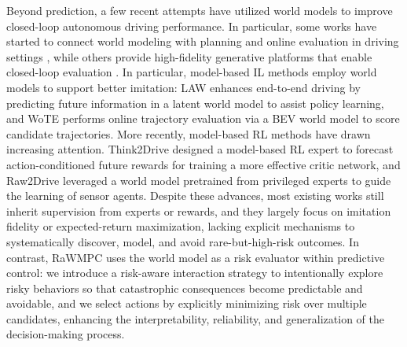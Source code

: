 \documentclass[twocolumn]{template}
\theoremstyle{thmstyleone}%
\theoremstyle{thmstyletwo}%
\theoremstyle{thmstylethree}%
\begin{document}
Beyond prediction, a few recent attempts have utilized world models to improve closed-loop autonomous driving performance. In particular, some works have started to connect world modeling with planning and online evaluation in driving settings \cite{DrivingGPT,Epona,WoTE},
while others provide high-fidelity generative platforms that enable closed-loop evaluation \cite{Navsim,DriveArena,Navsim_v2}. 
In particular, model-based IL methods \cite{MILE,LAW,WoTE,Drivedpo} employ world models to support better imitation: LAW \cite{LAW} enhances end-to-end driving by predicting future information in a latent world model to assist policy learning, and WoTE \cite{WoTE} performs online trajectory evaluation via a BEV world model to score candidate trajectories. 
More recently, model-based RL methods have drawn increasing attention. Think2Drive \cite{Think2drive} designed a model-based RL expert to forecast action-conditioned future rewards for training a more effective critic network, and Raw2Drive \cite{Raw2Drive} leveraged a world model pretrained from privileged experts to guide the learning of sensor agents. 
Despite these advances, most existing works still inherit supervision from experts or rewards, and they largely focus on imitation fidelity or expected-return maximization, lacking explicit mechanisms to systematically discover, model, and avoid rare-but-high-risk outcomes. In contrast, RaWMPC uses the world model as a risk evaluator within predictive control: we introduce a risk-aware interaction strategy to intentionally explore risky behaviors so that catastrophic consequences become predictable and avoidable, and we select actions by explicitly minimizing risk over multiple candidates, enhancing the interpretability, reliability, and generalization of the decision-making process.
\end{document}
